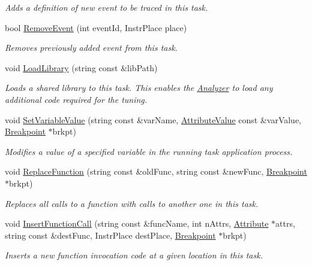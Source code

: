 \begin{DoxyCompactItemize}
\begin{DoxyCompactList}\small\item\em Adds a definition of new event to be traced in this task. \end{DoxyCompactList}\item 
bool \hyperlink{class_model_1_1_task_ac68058101cd807c900ab0b8770ce974d}{Remove\-Event} (int event\-Id, Instr\-Place place)
\begin{DoxyCompactList}\small\item\em Removes previously added event from this task. \end{DoxyCompactList}\item 
void \hyperlink{class_model_1_1_task_aaf4b60b2178d6ae90bfe2415b4b8268b}{Load\-Library} (string const \&lib\-Path)
\begin{DoxyCompactList}\small\item\em Loads a shared library to this task. This enables the \hyperlink{class_analyzer}{Analyzer} to load any additional code required for the tuning. \end{DoxyCompactList}\item 
void \hyperlink{class_model_1_1_task_a07a8c9caca410a1ae929c3ed47203bf4}{Set\-Variable\-Value} (string const \&var\-Name, \hyperlink{class_common_1_1_attribute_value}{Attribute\-Value} const \&var\-Value, \hyperlink{class_common_1_1_breakpoint}{Breakpoint} $\ast$brkpt)
\begin{DoxyCompactList}\small\item\em Modifies a value of a specified variable in the running task application process. \end{DoxyCompactList}\item 
void \hyperlink{class_model_1_1_task_a0702cd172b122148a87150189771b378}{Replace\-Function} (string const \&old\-Func, string const \&new\-Func, \hyperlink{class_common_1_1_breakpoint}{Breakpoint} $\ast$brkpt)
\begin{DoxyCompactList}\small\item\em Replaces all calls to a function with calls to another one in this task. \end{DoxyCompactList}\item 
void \hyperlink{class_model_1_1_task_a99b8545c85396bb6ab2d9ebe3fd87296}{Insert\-Function\-Call} (string const \&func\-Name, int n\-Attrs, \hyperlink{class_common_1_1_attribute}{Attribute} $\ast$attrs, string const \&dest\-Func, Instr\-Place dest\-Place, \hyperlink{class_common_1_1_breakpoint}{Breakpoint} $\ast$brkpt)
\begin{DoxyCompactList}\small\item\em Inserts a new function invocation code at a given location in this task. \end{DoxyCompactList}\item 

\end{DoxyCompactItemize}

